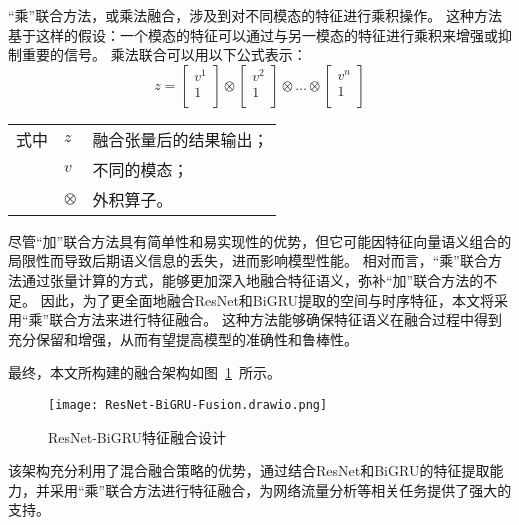 “乘”联合方法，或乘法融合，涉及到对不同模态的特征进行乘积操作。
这种方法基于这样的假设：一个模态的特征可以通过与另一模态的特征进行乘积来增强或抑制重要的信号。
乘法联合可以用以下公式表示：
\begin{equation}
	z = \begin{bmatrix}v^1 \\1\\\end{bmatrix} \otimes \begin{bmatrix}v^2 \\1\\\end{bmatrix} \otimes \dots \otimes \begin{bmatrix}v^n \\1\\\end{bmatrix}
\end{equation}
\begin{flushleft}
	\renewcommand\arraystretch{1.25}
	\begin{tabularx}{\textwidth}{@{}>{\normalsize\rm}l@{\quad}>{\normalsize\rm}l@{——}>{\normalsize\rm}X@{}}
		式中 & $z$       & 融合张量后的结果输出； \\
		     & $v$       & 不同的模态；           \\
		     & $\otimes$ & 外积算子。             \\
	\end{tabularx}\vspace{.5ex}
\end{flushleft}



尽管“加”联合方法具有简单性和易实现性的优势，但它可能因特征向量语义组合的局限性而导致后期语义信息的丢失，进而影响模型性能。
相对而言，“乘”联合方法通过张量计算的方式，能够更加深入地融合特征语义，弥补“加”联合方法的不足\cite{hejunandzhangcaiqing}。
因此，为了更全面地融合ResNet和BiGRU提取的空间与时序特征，本文将采用“乘”联合方法来进行特征融合。
这种方法能够确保特征语义在融合过程中得到充分保留和增强，从而有望提高模型的准确性和鲁棒性。\par

最终，本文所构建的融合架构如图~\ref{fig:ResNet-BiGRU-Fusion}~所示。
\begin{figure}[htbp]
	\centering
	\texttt{[image: ResNet-BiGRU-Fusion.drawio.png]}
	\caption{ResNet-BiGRU特征融合设计}
	\label{fig:ResNet-BiGRU-Fusion}
\end{figure}
该架构充分利用了混合融合策略的优势，通过结合ResNet和BiGRU的特征提取能力，并采用“乘”联合方法进行特征融合，为网络流量分析等相关任务提供了强大的支持。

